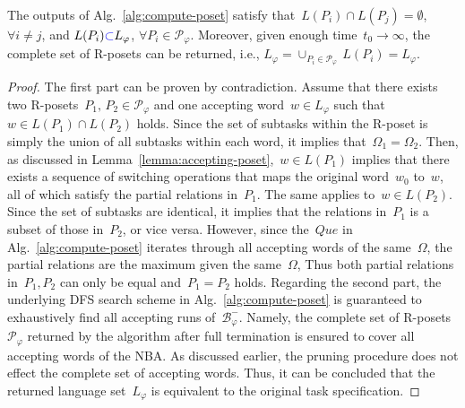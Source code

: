 \begin{lemma}\label{lemma:complete-poset}
The outputs of Alg.~\ref{alg:compute-poset}
satisfy that~$L(P_i)\cap L(P_j)=\emptyset$, $\forall i\neq j$,
and $L(P_i)\textcolor{blue}{\subset}  L_\varphi$, $\forall P_i \in \mathcal{P}_\varphi$.
Moreover, given enough time~$t_0\rightarrow \infty$,
the complete set of R-posets can be returned, i.e.,
$L_\varphi = \cup_{P_i\in \mathcal{P}_\varphi}\,L(P_i)=L_\varphi$.
\end{lemma}
\begin{proof}
The first part can be proven by contradiction.
 Assume that there exists two R-posets~$P_1,\,P_2\in \mathcal{P}_\varphi$
 and one accepting word~$w\in L_\varphi$ such that~$w\in L(P_1) \cap  L(P_2)$ holds.
Since the set of subtasks within the R-poset is simply
 the union of all subtasks within each word,
 it implies that~$\Omega_1 = \Omega_2$.
 Then, as discussed in Lemma~\ref{lemma:accepting-poset},~$w\in L(P_1)$ implies
 that there exists a sequence of switching operations that maps the original
 word~$w_0$ to~$w$, all of which satisfy the partial relations in~$P_1$.
 The same applies to~$w\in L(P_2)$.
 Since the set of subtasks are identical, it implies that the relations in~$P_1$
 is a subset of those in~$P_2$, or vice versa.
 However, since the~$Que$ in Alg.~\ref{alg:compute-poset} iterates through all
 accepting words of the same~$\Omega$,
 the partial relations are the maximum given the same~$\Omega$,
 Thus both partial relations in~$P_1, P_2$ can only be equal and~$P_1=P_2$ holds.
Regarding the second part,
the underlying DFS search scheme in Alg.~\ref{alg:compute-poset} is guaranteed
 to exhaustively find all accepting runs of~$\mathcal{B}^-_{\varphi}$.
 Namely, the complete set of R-posets~$\mathcal{P}_{\varphi}$ returned
 by the algorithm after full termination is ensured to cover all
 accepting words of the NBA.
 As discussed earlier, the pruning procedure does not effect
 the complete set of accepting words.
 Thus, it can be concluded that the returned language set~$L_\varphi$
 is equivalent to the original task specification.
\end{proof}

